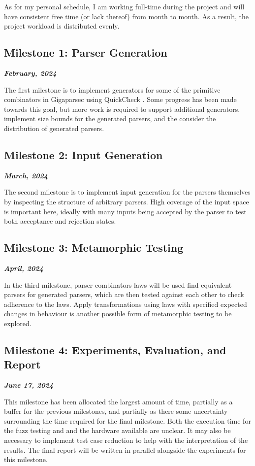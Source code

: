 \documentclass[11pt]{article}
\newcommand{\be}[1]{\textbf{\emph{#1}}}
\begin{document}
As for my personal schedule, I am working full-time during the project and will have consistent free time (or lack thereof) from month to month. As a result, the project workload is distributed evenly.

\subsection{Milestone 1: Parser Generation}
\be{February, 2024}

The first milestone is to implement generators for some of the primitive combinators in Gigaparsec using QuickCheck \cite{quickcheck}. Some progress has been made towards this goal, but more work is required to support additional generators, implement size bounds for the generated parsers, and the consider the distribution of generated parsers.

\subsection{Milestone 2: Input Generation}
\be{March, 2024}

The second milestone is to implement input generation for the parsers themselves by inspecting the structure of arbitrary parsers. High coverage of the input space is important here, ideally with many inputs being accepted by the parser to test both acceptance and rejection states.

\subsection{Milestone 3: Metamorphic Testing}
\be{April, 2024}

In the third milestone, parser combinators laws will be used find equivalent parsers for generated parsers, which are then tested against each other to check adherence to the laws. Apply transformations using laws with specified expected changes in behaviour is another possible form of metamorphic testing to be explored.

\subsection{Milestone 4: Experiments, Evaluation, and Report}
\be{June 17, 2024}

This milestone has been allocated the largest amount of time, partially as a buffer for the previous milestones, and partially as there some uncertainty surrounding the time required for the final milestone. Both the execution time for the fuzz testing and and the hardware available are unclear. It may also be necessary to implement test case reduction to help with the interpretation of the results. The final report will be written in parallel alongside the experiments for this milestone.
\end{document}
